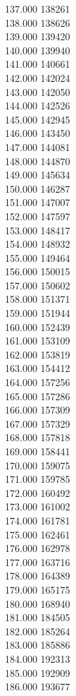 { 137.000	138261 \\
 138.000	138626 \\
 139.000	139420 \\
 140.000	139940 \\
 141.000	140661 \\
 142.000	142024 \\
 143.000	142050 \\
 144.000	142526 \\
 145.000	142945 \\
 146.000	143450 \\
 147.000	144081 \\
 148.000	144870 \\
 149.000	145634 \\
 150.000	146287 \\
 151.000	147007 \\
 152.000	147597 \\
 153.000	148417 \\
 154.000	148932 \\
 155.000	149464 \\
 156.000	150015 \\
 157.000	150602 \\
 158.000	151371 \\
 159.000	151944 \\
 160.000	152439 \\
 161.000	153109 \\
 162.000	153819 \\
 163.000	154412 \\
 164.000	157256 \\
 165.000	157286 \\
 166.000	157309 \\
 167.000	157329 \\
 168.000	157818 \\
 169.000	158441 \\
 170.000	159075 \\
 171.000	159785 \\
 172.000	160492 \\
 173.000	161002 \\
 174.000	161781 \\
 175.000	162461 \\
 176.000	162978 \\
 177.000	163716 \\
 178.000	164389 \\
 179.000	165175 \\
 180.000	168940 \\
 181.000	184505 \\
 182.000	185264 \\
 183.000	185886 \\
 184.000	192313 \\
 185.000	192909 \\
 186.000	193677 \\
}

